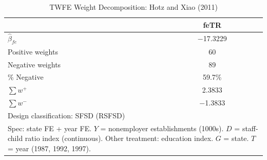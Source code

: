 \begin{table}[htbp]
\centering
\caption{TWFE Weight Decomposition: Hotz and Xiao (2011)}
\label{tab:hotz_xiao_weights}
\begin{tabular}{lc}
\toprule
 & feTR \\
\midrule
$\hat{\beta}_{fe}$ & $-$17.3229 \\
Positive weights & 60 \\
Negative weights & 89 \\
\% Negative & 59.7\% \\
$\sum w^+$ & 2.3833 \\
$\sum w^-$ & $-$1.3833 \\
\midrule
\multicolumn{2}{l}{\footnotesize Design classification: SFSD (RSFSD)} \\
\midrule
\multicolumn{2}{p{0.85\linewidth}}{\footnotesize
Spec: state FE + year FE.
$Y$ = nonemployer establishments (1000s).
$D$ = staff-child ratio index (continuous).
Other treatment: education index.
$G$ = state. $T$ = year (1987, 1992, 1997).}
\end{tabular}
\end{table}
